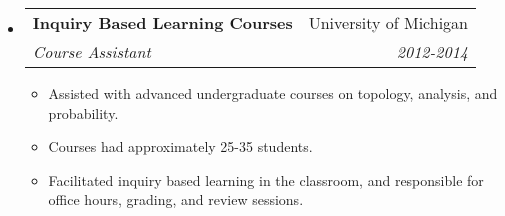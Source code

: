 \documentclass[letterpaper,11pt]{article}
\makeatletter
\newcommand{\resitem}[1]{\item #1 \vspace{-2pt}}
\newcommand{\ressubheading}[4]{
\begin{tabular*}{6.5in}[t]{l@{\cftdotfill{\cftsecdotsep}\extracolsep{\fill}}r}
		\textbf{#1} & #2 \\
		\textit{#3} & \textit{#4} \\
\end{tabular*}\vspace{-6pt}}
\makeatother
\begin{document}
\begin{itemize}
\item 
	\ressubheading{Inquiry Based Learning Courses}{University of Michigan}{Course Assistant}{2012-2014}
		\begin{itemize}
		\resitem{Assisted with advanced undergraduate courses on topology, analysis, and probability. }
		\resitem{Courses had approximately 25-35 students.}
		\resitem{Facilitated inquiry based learning in the classroom, and responsible for office hours, grading, and review sessions.}
		\end{itemize}
%
%
%
%
%
%
%	
%

\end{itemize}
\end{document}
